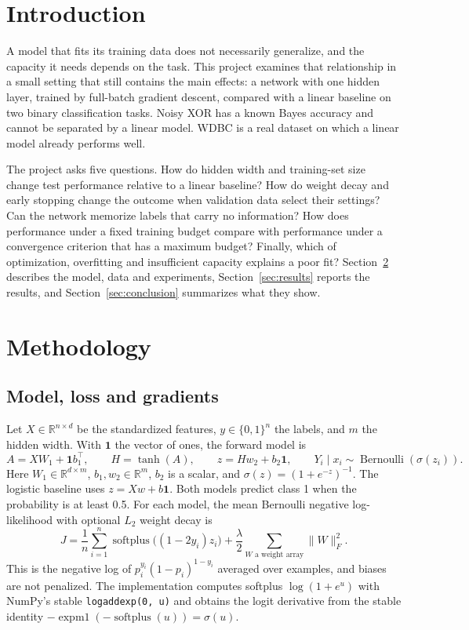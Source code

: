 \documentclass[11pt]{article}
\DeclareMathOperator{\softplus}{softplus}
\DeclareMathOperator{\Bernoulli}{Bernoulli}
\newcommand{\ones}{\mathbf{1}}
\begin{document}
\section{Introduction}

A model that fits its training data does not necessarily generalize, and the capacity it needs depends on the task. This project examines that relationship in a small setting that still contains the main effects: a network with one hidden layer, trained by full-batch gradient descent, compared with a linear baseline on two binary classification tasks. Noisy XOR has a known Bayes accuracy and cannot be separated by a linear model. WDBC is a real dataset on which a linear model already performs well.

The project asks five questions. How do hidden width and training-set size change test performance relative to a linear baseline? How do weight decay and early stopping change the outcome when validation data select their settings? Can the network memorize labels that carry no information? How does performance under a fixed training budget compare with performance under a convergence criterion that has a maximum budget? Finally, which of optimization, overfitting and insufficient capacity explains a poor fit? Section~\ref{sec:method} describes the model, data and experiments, Section~\ref{sec:results} reports the results, and Section~\ref{sec:conclusion} summarizes what they show.

\section{Methodology}\label{sec:method}

\subsection{Model, loss and gradients}

Let $X\in\mathbb{R}^{n\times d}$ be the standardized features, $y\in\{0,1\}^n$ the labels, and $m$ the hidden width. With $\ones$ the vector of ones, the forward model is
\begin{equation}
A=XW_1+\ones b_1^\top,\qquad H=\tanh(A),\qquad
z=Hw_2+b_2\ones,\qquad
Y_i\mid x_i\sim\Bernoulli(\sigma(z_i)).
\end{equation}
Here $W_1\in\mathbb{R}^{d\times m}$, $b_1,w_2\in\mathbb{R}^m$, $b_2$ is a scalar, and $\sigma(z)=(1+e^{-z})^{-1}$. The logistic baseline uses $z=Xw+b\ones$. Both models predict class 1 when the probability is at least 0.5. For each model, the mean Bernoulli negative log-likelihood with optional $L_2$ weight decay is
\begin{equation}
J=\frac1n\sum_{i=1}^n \softplus\bigl((1-2y_i)z_i\bigr)
  +\frac{\lambda}{2}\sum_{W\text{ a weight array}}\lVert W\rVert_F^2 .
\end{equation}
This is the negative log of $p_i^{y_i}(1-p_i)^{1-y_i}$ averaged over examples, and biases are not penalized. The implementation computes softplus $\log(1+e^u)$ with NumPy's stable \texttt{logaddexp(0, u)} and obtains the logit derivative from the stable identity $-\operatorname{expm1}(-\softplus(u))=\sigma(u)$.
\end{document}
